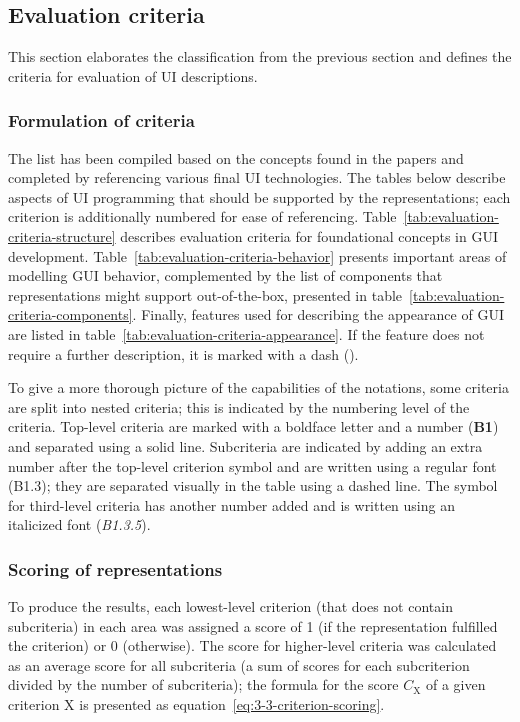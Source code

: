 \subsection{Evaluation criteria}\label{subsec:evaluation-criteria}

This section elaborates the classification from the previous section and defines the criteria for evaluation of UI descriptions.

\subsubsection{Formulation of criteria}
The list has been compiled based on the concepts found in the papers and completed by referencing various final UI technologies.
The tables below describe aspects of UI programming that should be supported by the representations;
each criterion is additionally numbered for ease of referencing.
Table~\ref{tab:evaluation-criteria-structure} describes evaluation criteria for foundational concepts in GUI development.
Table~\ref{tab:evaluation-criteria-behavior} presents important areas of modelling GUI behavior, complemented by the list of components that representations might support out-of-the-box, presented in table~\ref{tab:evaluation-criteria-components}.
Finally, features used for describing the appearance of GUI are listed in table~\ref{tab:evaluation-criteria-appearance}.
If the feature does not require a further description, it is marked with a dash (\textemdash).

To give a more thorough picture of the capabilities of the notations, some criteria are split into nested criteria;
this is indicated by the numbering level of the criteria.
Top-level criteria are marked with a boldface letter and a number (\textbf{B1}) and separated using a solid line.
Subcriteria are indicated by adding an extra number after the top-level criterion symbol and are written using a regular font (B1.3);
they are separated visually in the table using a dashed line.
The symbol for third-level criteria has another number added and is written using an italicized font (\textit{B1.3.5}).

\subsubsection{Scoring of representations}
To produce the results, each lowest-level criterion (that does not contain subcriteria) in each area was assigned a score of 1 (if the representation fulfilled the criterion) or 0 (otherwise).
The score for higher-level criteria was calculated as an average score for all subcriteria (a sum of scores for each subcriterion divided by the number of subcriteria);
the formula for the score $C_\text{X}$ of a given criterion X is presented as  equation~\ref{eq:3-3-criterion-scoring}.

